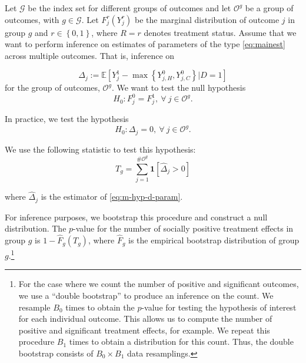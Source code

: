 Let $\mathcal{G}$ be the index set for different groups of outcomes and let $\mathcal{O}^{g}$ be a group of outcomes, with $g \in \mathcal{G}$. Let $F_{j}^r \left( Y_{j}^r \right) $ be the marginal distribution of outcome $j$ in group $g$ and $r \in \left\{ 0,1 \right\}$, where $R = r$ denotes treatment status. Assume that we want to perform inference on estimates of parameters of the type \eqref{eq:mainest} across multiple outcomes. That is, inference on

\begin{equation}
\Delta_{j} := \mathbb{E} \left[ Y_{j}^1 -  \max \left\{  Y_{j,H}^0 ,  Y_{j,C}^0 \right\} | D =1 \right] \label{eq:m-hyp-d-param}
\end{equation}
for the group of outcomes, $\mathcal{O}^{g}$. We want to test the null hypothesis
\begin{equation}
H_{0} : F_{j}^0 = F_{j}^1, \ \forall \ j \in \mathcal{O}^{g}.
\end{equation}

\noindent In practice, we test the hypothesis
\begin{equation}
H_{0} : \Delta_{j} = 0, \ \forall \ j \in \mathcal{O}^{g}.
\end{equation}

\noindent We use the following statistic to test this hypothesis:
\begin{equation}
T_{g} = \sum _{j=1}^{\# \mathcal{O}^g} \mathbf{1} \left[ \widehat{\Delta}_{j} > 0\right] \label{eq:count}
\end{equation}

\noindent where $\widehat{\Delta}_{j}$ is the estimator of \eqref{eq:m-hyp-d-param}.

For inference purposes, we bootstrap this procedure and construct a null distribution. The $p$-value for the number of socially positive treatment effects in group $g$ is $1 - \widehat{F}_{g} \left( T_{g} \right)$, where $ \widehat{F}_{g}$ is the empirical bootstrap distribution of group $g$.\footnote{For the case where we count the number of positive and significant outcomes, we use a ``double bootstrap'' to produce an inference on the count. We resample $B_{0}$ times to obtain the $p$-value for testing the hypothesis of interest for each individual outcome. This allows us to compute the number of positive and significant treatment effects, for example. We repeat this procedure $B_{1}$ times to obtain a distribution for this count. Thus, the double bootstrap consists of $B_{0} \times B_{1}$ data resamplings.}

